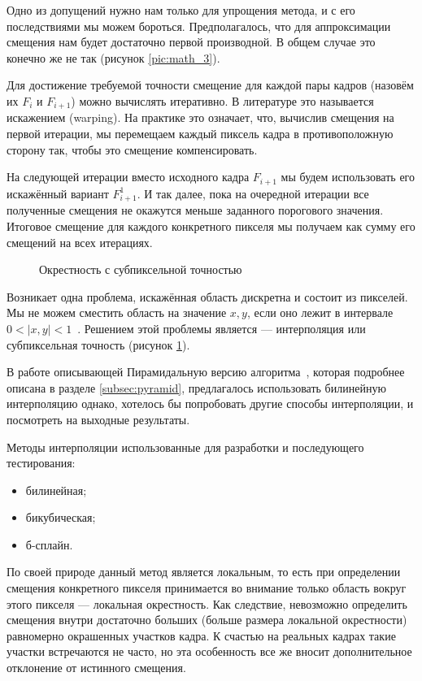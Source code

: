 Одно из допущений нужно нам только для упрощения метода, и с его последствиями мы можем бороться. Предполагалось, что для аппроксимации смещения нам будет достаточно первой производной. В общем случае это конечно же не так (рисунок \ref{pic:math_3}). 

Для достижение требуемой точности смещение для каждой пары кадров (назовём их $F_i$ и $F_{i+1}$) можно вычислять итеративно. В литературе это называется искажением (warping). На практике это означает, что, вычислив смещения на первой итерации, мы перемещаем каждый пиксель кадра в противоположную сторону так, чтобы это смещение компенсировать.

На следующей итерации вместо исходного кадра $F_{i+1}$ мы будем использовать его искажённый вариант $F_{i+1}^1$. И так далее, пока на очередной итерации все полученные смещения не окажутся меньше заданного порогового значения. Итоговое смещение для каждого конкретного пикселя мы получаем как сумму его смещений на всех итерациях. 
\begin{figure}[ht]
\caption{Окрестность с субпиксельной точностью}
\label{pic:grid}
\end{figure}

Возникает одна проблема, искажённая область дискретна и состоит из пикселей. Мы не можем сместить область на значение $x,y$, если оно лежит в интервале $0< |x,y| < 1$~\cite{sub_toch}. Решением этой проблемы является — интерполяция или субпиксельная точность (рисунок \ref{pic:grid}).

В работе описывающей Пирамидальную версию алгоритма~\cite{Bouguet2000}, которая подробнее описана в разделе \ref{subsec:pyramid}, предлагалось использовать билинейную интерполяцию однако, хотелось бы попробовать другие способы интерполяции, и посмотреть на выходные результаты.

Методы интерполяции использованные для разработки и последующего тестирования:
\begin{itemize}
\item билинейная;
\item бикубическая;
\item б-сплайн.
\end{itemize}

По своей природе данный метод является локальным, то есть при определении смещения конкретного пикселя принимается во внимание только область вокруг этого пикселя — локальная окрестность. Как следствие, невозможно определить смещения внутри достаточно больших (больше размера локальной окрестности) равномерно окрашенных участков кадра. К счастью на реальных кадрах такие участки встречаются не часто, но эта особенность все же вносит дополнительное отклонение от истинного смещения.

